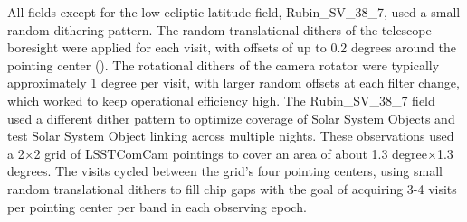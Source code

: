 All fields except for the low ecliptic latitude field, Rubin\_SV\_38\_7, used a small random dithering pattern.
The random translational dithers of the telescope boresight were applied for each visit, with offsets of up to 0.2 degrees around the pointing center ().
The rotational dithers of the camera rotator were typically approximately 1 degree per visit, with larger random offsets at each filter change, which worked to keep operational efficiency high.
The Rubin\_SV\_38\_7 field used a different dither pattern to optimize coverage of Solar System Objects and test Solar System Object linking across multiple nights.
These observations used a 2$\times$2 grid of \gls{LSSTComCam} pointings to cover an area of about 1.3 degree$\times$1.3 degrees.
The visits cycled between the grid's four pointing centers, using small random translational dithers to fill chip gaps with the goal of acquiring 3-4 visits per pointing center per band in each observing epoch.
